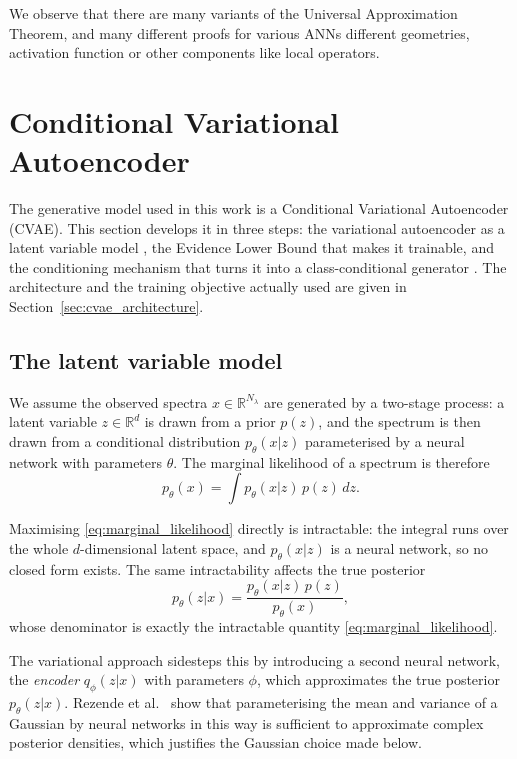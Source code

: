 We observe that there are many variants of the Universal Approximation Theorem, and many different proofs for various ANNs different geometries, activation function or other components like local operators.


\section{Conditional Variational Autoencoder}
\label{sec:cvae}

The generative model used in this work is a Conditional Variational Autoencoder (CVAE). This
section develops it in three steps: the variational autoencoder as a latent variable model
\cite{kingma2014vae}, the Evidence Lower Bound that makes it trainable, and the conditioning
mechanism that turns it into a class-conditional generator \cite{sohn2015cvae}. The
architecture and the training objective actually used are given in
Section~\ref{sec:cvae_architecture}.

\subsection*{The latent variable model}

We assume the observed spectra $x \in \mathbb{R}^{N_\lambda}$ are generated by a two-stage
process: a latent variable $z \in \mathbb{R}^{d}$ is drawn from a prior $p(z)$, and the
spectrum is then drawn from a conditional distribution $p_\theta(x|z)$ parameterised by a
neural network with parameters $\theta$. The marginal likelihood of a spectrum is therefore
\begin{equation}
p_\theta(x) = \int p_\theta(x|z)\, p(z) \, dz .
\label{eq:marginal_likelihood}
\end{equation}

Maximising \eqref{eq:marginal_likelihood} directly is intractable: the integral runs over the
whole $d$-dimensional latent space, and $p_\theta(x|z)$ is a neural network, so no closed form
exists. The same intractability affects the true posterior
\begin{equation}
p_\theta(z|x) = \frac{p_\theta(x|z)\,p(z)}{p_\theta(x)},
\label{eq:true_posterior}
\end{equation}
whose denominator is exactly the intractable quantity \eqref{eq:marginal_likelihood}.

The variational approach sidesteps this by introducing a second neural network, the
\emph{encoder} $q_\phi(z|x)$ with parameters $\phi$, which approximates the true posterior
$p_\theta(z|x)$. Rezende et al.\ \cite{rezende2014stochastic} show that parameterising the
mean and variance of a Gaussian by neural networks in this way is sufficient to approximate
complex posterior densities, which justifies the Gaussian choice made below.

